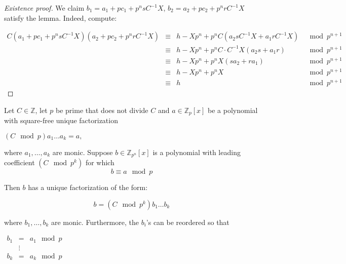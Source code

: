 \begin{frame}
{\begin{proof}[Existence proof]
We claim
$b_1 = a_1 + pc_1 +p^n sC^{-1}X$, 
$b_2 = a_2+ pc_2 + p^n rC^{-1}X$ 
satisfy the lemma. Indeed, compute:
	
$
\begin{array}{rcll}
C\left(a_1+pc_1+p^n sC^{-1}X \right)\left(a_2+pc_2+p^nrC^{-1}X \right)&\equiv& h-Xp^n+ p^nC\left(a_2sC^{-1}X+a_1rC^{-1}X\right)     & \mod p^{n+1}\\
&\equiv&h-Xp^n+  p^nC\cdot C^{-1}X\left(a_2s+a_1r\right)&\mod p^{n+1}\\
&\equiv&h-Xp^n+ p^nX\left(s a_2 + r a_1\right) &\mod p^{n+1}\\
&\equiv&h-Xp^n+ p^nX&\mod p^{n+1}\\
&\equiv & h&\mod p^{n+1}
\end{array}
$
\end{proof}
}



\vskip 10cm
\end{frame}



\begin{frame}
	
	\begin{theorem}
		Let $C\in \mathbb Z$, let $p$ be prime that does not divide $C$ and $a\in \mathbb Z_{p}[x]$ be a polynomial with square-free unique factorization
		
		\hfil\hfil$
		(C\mod p) a_1\dots a_k =  a,
		$ 
		 
		where $a_1, \dots, a_k$ are monic. Suppose $b\in \mathbb Z_{p^n}[x]$ is a polynomial with leading coefficient $\left(C \mod p^k\right) $ for which \[b \equiv  a \mod p \]
		
		
		Then $b$ has a unique factorization of the form:
		
		\[
		b =(C \mod p^{k}) b_1\dots b_k 
		\]
		
		where $b_1, \dots, b_k $ are monic.
		Furthermore, the $b_i$'s can be reordered so that 
		
		\hfil\hfil$
		\begin{array}{rcl}
		b_1 &=& a_1 \mod p\\
		&\vdots\\
		b_k&=& a_k \mod p
		\end{array}
		$
	\end{theorem}
	
\end{frame}

